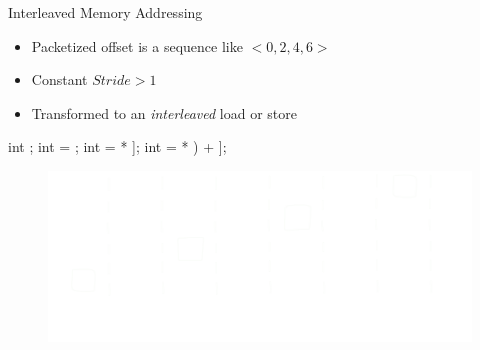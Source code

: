 \begin{frame}[fragile]{Interleaved Memory Addressing}

\begin{itemize}
    \item Packetized offset is a sequence like $<0, 2, 4, 6>$
    \item Constant $Stride > 1$
    \item Transformed to an \emph{interleaved} load or store
\end{itemize}

\begin{minipage}[t]{0.40\linewidth}
    \vspace{0.1ex}
    \begin{codebox}[commandchars=\\\[\]]
    
int \uniform[*src];
int \varying[tid] = ;
int \varying[even] = \uniform[src]\idx[\varying[tid] * \uniform[2]];
int \varying[odd] = \uniform[src]\idx[(\varying[tid] * \uniform[2]) + \uniform[1]];




    \end{codebox}
\end{minipage}
\hspace{2em}
\begin{minipage}[t]{0.49\linewidth}
    \vspace{0.6ex}
    \begin{figure}
        \includegraphics[width=1.0\textwidth]{images/interleaved-access.pdf}
    \end{figure}
\end{minipage}

\end{frame}


